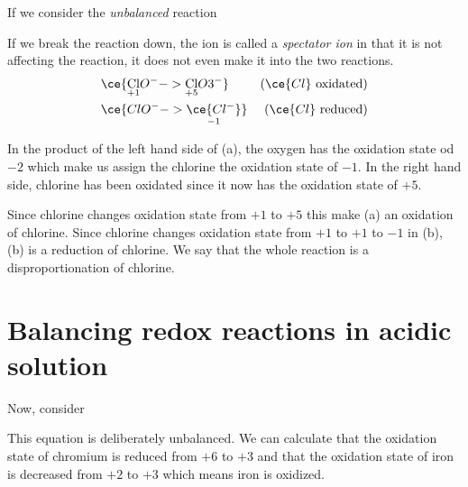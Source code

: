 \documentclass[../mit-general-chemistry.tex]{subfiles}
\begin{document}
If we consider the {\em unbalanced} reaction

If we break the reaction down, the  ion is called a {\em
  spectator ion} in that it is not affecting the reaction, it does not
even make it into the two reactions.
\begin{align*}
  &\ce{\underset{\footnotesize +1}{\mathrm{Cl}}O^- -> \underset{\footnotesize +5}{\mathrm{Cl}}O3^-}&(\ce{Cl}~\text{oxidated})\\
  &\ce{ClO^- -> \underset{\footnotesize -1}{\ce{Cl^-}}}&(\ce{Cl}~\text{reduced})\\
\end{align*}

In the product of the left hand side of (a), the oxygen has the
oxidation state od $-2$ which make us assign the chlorine the
oxidation state of $-1$. In the right hand side, chlorine has been
oxidated since it now has the oxidation state of $+5$.

Since chlorine changes oxidation state from $+1$ to $+5$ this make (a)
an oxidation of chlorine. Since chlorine changes oxidation state from
$+1$ to $+1$ to $-1$ in (b), (b) is a reduction of chlorine. We say
that the whole reaction is a disproportionation of chlorine.






\section{Balancing redox reactions in acidic solution}



Now, consider


This equation is deliberately unbalanced. We can calculate that the
oxidation state of chromium is reduced from $+6$ to $+3$ and that the
oxidation state of iron is decreased from $+2$ to $+3$ which means
iron is oxidized.
\end{document}
